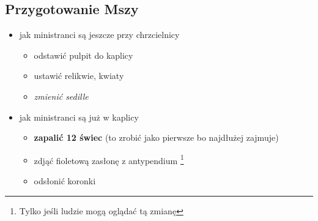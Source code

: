 \subsection{Przygotowanie Mszy}
\begin{itemize}
	\item jak ministranci są jeszcze przy chrzcielnicy
	      \begin{itemize}
		      \item odstawić pulpit do kaplicy
		      \item ustawić relikwie, kwiaty
		      \item \textit{zmienić sedille} 
	      \end{itemize}
	\item jak ministranci są już w kaplicy
	      \begin{itemize}
		      \item \textbf{zapalić 12 świec} (to zrobić jako pierwsze bo
		            najdłużej zajmuje)
		      \item zdjąć {\color{violet} fioletową} zasłonę z antypendium
		            \footnote{Tylko jeśli ludzie mogą oglądać tą zmianę}
		      \item odsłonić koronki
	      \end{itemize}
\end{itemize}

